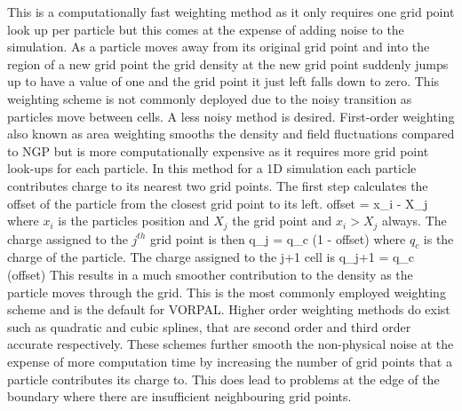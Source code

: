 This is a computationally fast weighting method as it only requires one grid point look up per particle but this comes at the expense of adding noise to the simulation. As a particle moves away from its original grid point and into the region of a new grid point the grid density at the new grid point suddenly jumps up to have a value of one and the grid point it just left falls down to zero. This weighting scheme is not commonly deployed due to the noisy transition as particles move between cells.  A less noisy method is desired. First-order weighting also known as area weighting smooths the density and field fluctuations compared to NGP but is more computationally expensive as it requires more grid point look-ups for each particle. In this method for a 1D simulation each particle contributes charge to its nearest two grid points. The first step calculates the offset of the particle from the closest grid point to its left. 
\be
offset = x_i - X_j 
\ee 
where $x_i$ is the particles position and $X_j$ the grid point and $x_i > X_j$ always. The charge assigned to the $j^{th}$ grid point is then 
\be 
q_j = q_c \left(1 - offset\right)
\ee 
where $q_c$ is the charge of the particle. 
The charge assigned to the j+1 cell is 
\be 
q_{j+1} = q_c \left(offset\right)
\ee 
This results in a much smoother contribution to the density as the particle moves through the grid. This is the most commonly employed weighting scheme and is the default for VORPAL. Higher order weighting methods do exist such as quadratic and cubic splines, that are second order and third order accurate respectively. These schemes further smooth the non-physical noise at the expense of more computation time by increasing the number of grid points that a particle contributes its charge to. This does lead to problems at the edge of the boundary where there are insufficient neighbouring grid points. 




